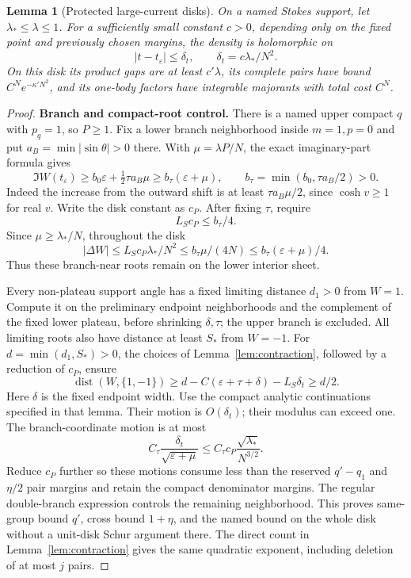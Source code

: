 \documentclass[11pt]{article}
\numberwithin{equation}{section}
\newtheorem{lemma}[theorem]{Lemma}
\theoremstyle{definition}
\newcommand{\eps}{\varepsilon}
\begin{document}
\begin{lemma}[Protected large-current disks]\label{lem:protected}
On a named Stokes support, let \(\lambda_*\le\lambda\le1\).
For a sufficiently small constant \(c>0\), depending only on
the fixed point and previously chosen margins, the density is
holomorphic on
\[
 |t-t_\eps|\le\delta_t,\qquad \delta_t=c\lambda_*/N^2 .
\]
On this disk its product gaps are at least \(c'\lambda\),
its complete pairs have bound \(C^Ne^{-\kappa' N^2}\), and its
one-body factors have integrable majorants with total cost \(C^N\).
\end{lemma}
\begin{proof}
\noindent\textbf{Branch and compact-root control.} There is a named upper compact \(q\) with \(p_q=1\), so
\(P\ge1\). Fix a lower branch neighborhood inside \(m=1,p=0\)
and put \(a_B=\min|\sin\theta|>0\) there. With
\(\mu=\lambda P/N\), the exact imaginary-part formula gives
\[
 \Im W(t_\eps)\ge b_0\eps+\tfrac12\tau a_B\mu
 \ge b_\tau(\eps+\mu),\qquad
 b_\tau=\min(b_0,\tau a_B/2)>0.
\]
Indeed the increase from the outward shift is at least
\(\tau a_B\mu/2\), since \(\cosh v\ge1\) for real \(v\).
Write the disk constant as \(c_P\). After fixing \(\tau\), require
\[
 L_Sc_P\le b_\tau/4.
\]
Since \(\mu\ge\lambda_*/N\), throughout the disk
\[
 |\Delta W|\le L_Sc_P\lambda_*/N^2
 \le b_\tau \mu/(4N)\le b_\tau(\eps+\mu)/4.
\]
Thus these branch-near roots remain on the lower interior sheet.

Every non-plateau support angle has a fixed limiting distance
\(d_1>0\) from \(W=1\). Compute it on the preliminary endpoint
neighborhoods and the complement of the fixed lower plateau,
before shrinking \(\delta,\tau\); the upper branch is excluded.
All limiting
roots also have distance at least \(S_*\) from \(W=-1\).
For \(d=\min(d_1,S_*)>0\), the choices of
Lemma~\ref{lem:contraction}, followed by a reduction of \(c_P\),
ensure
\[
 \operatorname{dist}(W,\{1,-1\})
 \ge d-C(\eps+\tau+\delta)-L_S\delta_t\ge d/2.
\]
Here \(\delta\) is the fixed endpoint width.
Use the compact analytic continuations specified in that lemma.
Their motion is \(O(\delta_t)\); their modulus can exceed one.
The branch-coordinate motion is at most
\[
 C_\tau\frac{\delta_t}{\sqrt{\eps+\mu}}
 \le C_\tau c_P\frac{\sqrt{\lambda_*}}{N^{3/2}}.
\]
Reduce \(c_P\) further so these motions consume less than
the reserved \(q'-q_1\) and \(\eta/2\) pair margins and retain
the compact denominator margins. The regular double-branch
expression controls the remaining neighborhood. This proves
same-group bound \(q'\), cross bound \(1+\eta\), and the named
bound on the whole disk without a unit-disk Schur argument there.
The direct count in Lemma~\ref{lem:contraction} gives the same
quadratic exponent, including deletion of at most \(j\) pairs.


\end{proof}
\end{document}
